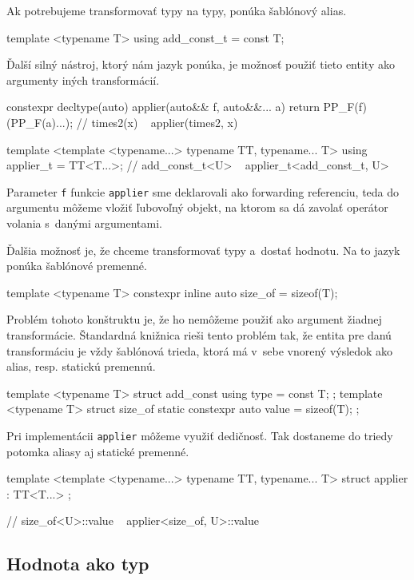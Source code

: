 Ak potrebujeme transformovať typy na typy, \Cpp{} ponúka šablónový alias.
\begin{code}
template <typename T> using add_const_t = const T;
\end{code}

Ďalší silný nástroj, ktorý nám jazyk ponúka, je možnosť použiť tieto entity ako argumenty iných transformácií.
\begin{code}
constexpr decltype(auto) applier(auto&& f, auto&&... a)
{ return PP_F(f)(PP_F(a)...); }
// times2(x) ~ applier(times2, x)

template <template <typename...> typename TT, typename... T>
using applier_t = TT<T...>;
// add_const_t<U> ~ applier_t<add_const_t, U>
\end{code}
Parameter \texttt{f} funkcie \texttt{applier} sme deklarovali ako forwarding referenciu, teda do argumentu môžeme vložiť ľubovoľný objekt, na ktorom sa dá zavolať operátor volania s~danými argumentami.

Ďalšia možnosť je, že chceme transformovať typy a~dostať hodnotu. Na to jazyk ponúka šablónové premenné.
\begin{code}
template <typename T> constexpr inline auto size_of = sizeof(T);
\end{code}
Problém tohoto konštruktu je, že ho nemôžeme použiť ako argument žiadnej transformácie. Štandardná knižnica rieši tento problém tak, že entita pre danú transformáciu je vždy šablónová trieda, ktorá má v~sebe vnorený výsledok ako alias, resp. statickú premennú.
\begin{code}
template <typename T> struct add_const { using type = const T; };
template <typename T>
struct size_of { static constexpr auto value = sizeof(T); };
\end{code}
Pri implementácii \texttt{applier} môžeme využiť dedičnosť. Tak dostaneme do triedy potomka aliasy aj statické premenné.
\begin{code}
template <template <typename...> typename TT, typename... T>
struct applier : TT<T...> {};

// size_of<U>::value ~ applier<size_of, U>::value
\end{code}

\subsection{Hodnota ako typ}

